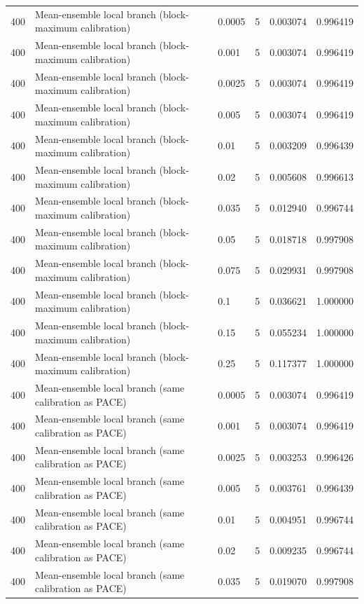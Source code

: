 \begin{tabular}{llllll}
400 & Mean-ensemble local branch (block-maximum calibration) & 0.0005 & 5 & 0.003074 & 0.996419 \\
400 & Mean-ensemble local branch (block-maximum calibration) & 0.001 & 5 & 0.003074 & 0.996419 \\
400 & Mean-ensemble local branch (block-maximum calibration) & 0.0025 & 5 & 0.003074 & 0.996419 \\
400 & Mean-ensemble local branch (block-maximum calibration) & 0.005 & 5 & 0.003074 & 0.996419 \\
400 & Mean-ensemble local branch (block-maximum calibration) & 0.01 & 5 & 0.003209 & 0.996439 \\
400 & Mean-ensemble local branch (block-maximum calibration) & 0.02 & 5 & 0.005608 & 0.996613 \\
400 & Mean-ensemble local branch (block-maximum calibration) & 0.035 & 5 & 0.012940 & 0.996744 \\
400 & Mean-ensemble local branch (block-maximum calibration) & 0.05 & 5 & 0.018718 & 0.997908 \\
400 & Mean-ensemble local branch (block-maximum calibration) & 0.075 & 5 & 0.029931 & 0.997908 \\
400 & Mean-ensemble local branch (block-maximum calibration) & 0.1 & 5 & 0.036621 & 1.000000 \\
400 & Mean-ensemble local branch (block-maximum calibration) & 0.15 & 5 & 0.055234 & 1.000000 \\
400 & Mean-ensemble local branch (block-maximum calibration) & 0.25 & 5 & 0.117377 & 1.000000 \\
400 & Mean-ensemble local branch (same calibration as PACE) & 0.0005 & 5 & 0.003074 & 0.996419 \\
400 & Mean-ensemble local branch (same calibration as PACE) & 0.001 & 5 & 0.003074 & 0.996419 \\
400 & Mean-ensemble local branch (same calibration as PACE) & 0.0025 & 5 & 0.003253 & 0.996426 \\
400 & Mean-ensemble local branch (same calibration as PACE) & 0.005 & 5 & 0.003761 & 0.996439 \\
400 & Mean-ensemble local branch (same calibration as PACE) & 0.01 & 5 & 0.004951 & 0.996744 \\
400 & Mean-ensemble local branch (same calibration as PACE) & 0.02 & 5 & 0.009235 & 0.996744 \\
400 & Mean-ensemble local branch (same calibration as PACE) & 0.035 & 5 & 0.019070 & 0.997908 \\

\end{tabular}
